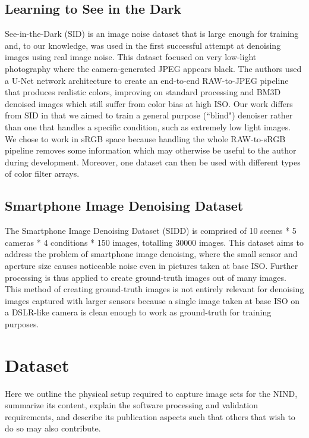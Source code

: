 \documentclass[10pt,twocolumn,letterpaper]{article}
\begin{document}
\subsection{Learning to See in the Dark}
See-in-the-Dark (SID) \cite{learningtoseeinthedark} is an image noise dataset that is large enough for training and, to our knowledge, was used in the first successful attempt at denoising images using real image noise. This dataset focused on very low-light photography where the camera-generated JPEG appears black. The authors used a U-Net network architecture to create an end-to-end RAW-to-JPEG pipeline that produces realistic colors, improving on standard processing and BM3D denoised images which still suffer from color bias at high ISO. Our work differs from SID in that we aimed to train a general purpose (``blind") denoiser rather than one that handles a specific condition, such as extremely low light images. We chose to work in sRGB space because handling the whole RAW-to-sRGB pipeline removes some information which may otherwise be useful to the author during development. Moreover, one dataset can then be used with different types of color filter arrays.
\subsection{Smartphone Image Denoising Dataset}
The Smartphone Image Denoising Dataset (SIDD) \cite{sidd} is comprised of 10 scenes * 5 cameras * 4 conditions * 150 images, totalling 30000 images. This dataset aims to address the problem of smartphone image denoising, where the small sensor and aperture size causes noticeable noise even in pictures taken at base ISO. Further processing is thus applied to create ground-truth images out of many images. This method of creating ground-truth images is not entirely relevant for denoising images captured with larger sensors because a single image taken at base ISO on a DSLR-like camera is clean enough to work as ground-truth for training purposes.
%


\section{Dataset}
Here we outline the physical setup required to capture image sets for the NIND, summarize its content, explain the software processing and validation requirements, and describe its publication aspects such that others that wish to do so may also contribute.
\end{document}
